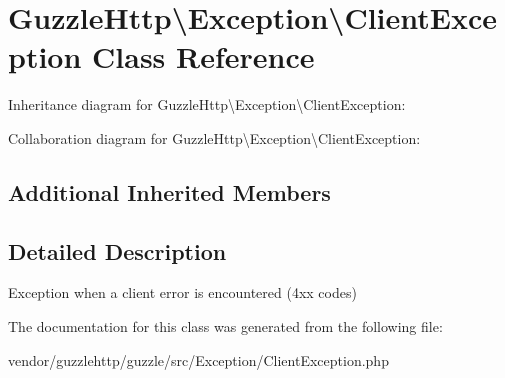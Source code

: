 \hypertarget{classGuzzleHttp_1_1Exception_1_1ClientException}{}\section{Guzzle\+Http\textbackslash{}Exception\textbackslash{}Client\+Exception Class Reference}
\label{classGuzzleHttp_1_1Exception_1_1ClientException}


Inheritance diagram for Guzzle\+Http\textbackslash{}Exception\textbackslash{}Client\+Exception\+:


Collaboration diagram for Guzzle\+Http\textbackslash{}Exception\textbackslash{}Client\+Exception\+:
\subsection*{Additional Inherited Members}


\subsection{Detailed Description}
Exception when a client error is encountered (4xx codes) 

The documentation for this class was generated from the following file\+:\begin{DoxyCompactItemize}
\item 
vendor/guzzlehttp/guzzle/src/\+Exception/Client\+Exception.\+php\end{DoxyCompactItemize}
